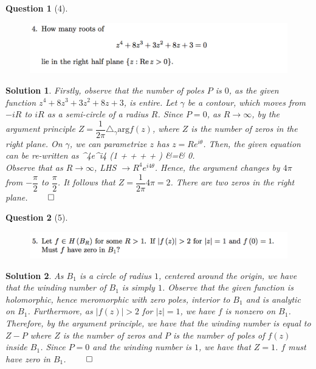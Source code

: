 \documentclass{article} %
\def\eQb#1\eQe{\begin{eqnarray*}#1\end{eqnarray*}}
\theoremstyle{quest}
\newtheorem*{question}{Question}
\newtheorem*{solution}{Solution}
\begin{document}
\begin{question}[4]
\hfill
\begin{figure}[h!]
\centering
\includegraphics[width=1\textwidth]{cv-9-4}
\end{figure}
\end{question}
\begin{solution}
Firstly, observe that the number of poles $P$ is $0$, as the given 
function $z^4 + 8z^3 + 3z^2 + 8z + 3$, is entire. 
Let $\gamma$ be a contour, which moves from $-iR$ to $iR$ as a semi-circle
of a radius $R$. Since $P = 0$, as $R \to \infty$, 
by the argument principle
$Z = \dfrac{1}{2\pi}\triangle_{\gamma} 
\text{arg} f(z)$, where $Z$ is the number
of zeros in the right plane.  
On $\gamma$, we can parametrize $z$ has $z = Re^{i\theta}$.
Then, the given equation can be re-written as 
\eQb
R^{4}e^{i4\theta} (1 +  + 
 + + 
) &=& 0. \\
\eQe 
Observe that as $R \to \infty$, LHS $\to R^4e^{i4\theta}$. Hence,
the argument changes by $4\pi$ from $-\dfrac{\pi}{2}$ to $\dfrac{\pi}{2}$.
It follows that $Z = \dfrac{1}{2\pi} 4\pi = 2$. There are two zeros
in the right plane. \hfill $\qed$  
\end{solution}

\newpage

\begin{question}[5]
\hfill
\begin{figure}[h!]
\centering
\includegraphics[width=1\textwidth]{cv-9-5}
\end{figure}
\end{question}
\begin{solution}
As $B_1$ is a circle of radius $1$, centered around the origin,
we have that the winding number of $B_1$ is simply $1$. Observe that
the given function is holomorphic, hence meromorphic with zero poles, 
interior to $B_1$ and is analytic on $B_1$. Furthermore, as $|f(z)| > 2$
for $|z| = 1$, we have $f$ is nonzero on $B_1$. Therefore, by the argument
principle, we have that the winding number is equal to $Z - P$ where
$Z$ is the number of zeros and $P$ is the number of poles of $f(z)$
inside $B_1$. Since $P = 0$ and the winding number is $1$,
 we have that $Z = 1$. $f$ must have zero in $B_1$.
 \hfill $\qed$
\end{solution}
\end{document}

